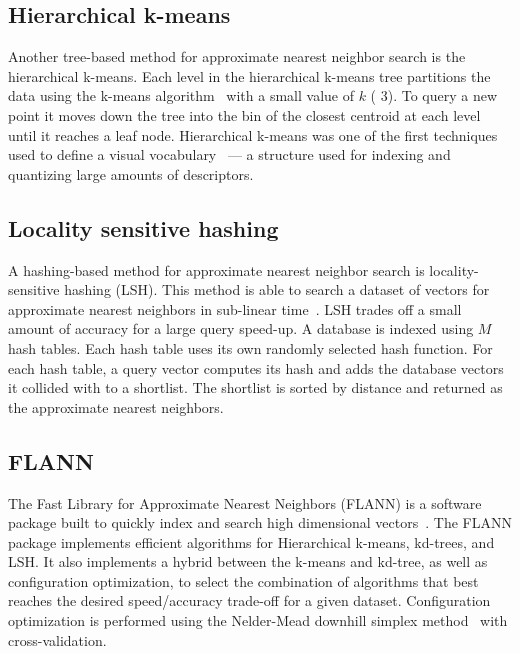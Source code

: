         \subsection{Hierarchical k-means}
            Another tree-based method for approximate nearest neighbor search is the hierarchical k-means. Each
            level in the hierarchical k-means tree partitions the data using the k-means
            algorithm~\cite{lloyd_least_1982} with a small value of $k$ (\eg{} 3). To query a new point it moves
            down the tree into the bin of the closest centroid at each level until it reaches a leaf node.
            Hierarchical k-means was one of the first techniques used to define a visual
            vocabulary~\cite{nister_scalable_2006} --- a structure used for indexing and quantizing large amounts
            of descriptors.
        
        \subsection{Locality sensitive hashing}
            A hashing-based method for approximate nearest neighbor search is locality-sensitive hashing (LSH).
            This method is able to search a dataset of vectors for approximate nearest neighbors in sub-linear
            time~\cite{charikar_similarity_2002, datar_locality_sensitive_2004, kulis_fast_2009,
            kulis_kernelized_2012, tao_locality_2013}. LSH trades off a small amount of accuracy for a large query
            speed-up. A database is indexed using $M$ hash tables. Each hash table uses its own randomly selected
            hash function. For each hash table, a query vector computes its hash and adds the database vectors it
            collided with to a shortlist. The shortlist is sorted by distance and returned as the approximate
            nearest neighbors.

        \subsection{FLANN}
            The Fast Library for Approximate Nearest Neighbors (FLANN) is a software package built to quickly index
            and search high dimensional vectors~\cite{muja_fast_2009}. The FLANN package implements efficient
            algorithms for Hierarchical k-means, kd-trees, and LSH{}. It also implements a hybrid between the
            k-means and kd-tree, as well as configuration optimization, to select the combination of algorithms
            that best reaches the desired speed/accuracy trade-off for a given dataset. Configuration optimization
            is performed using the Nelder-Mead downhill simplex method~\cite{nelder_simplex_1965} with
            cross-validation.

